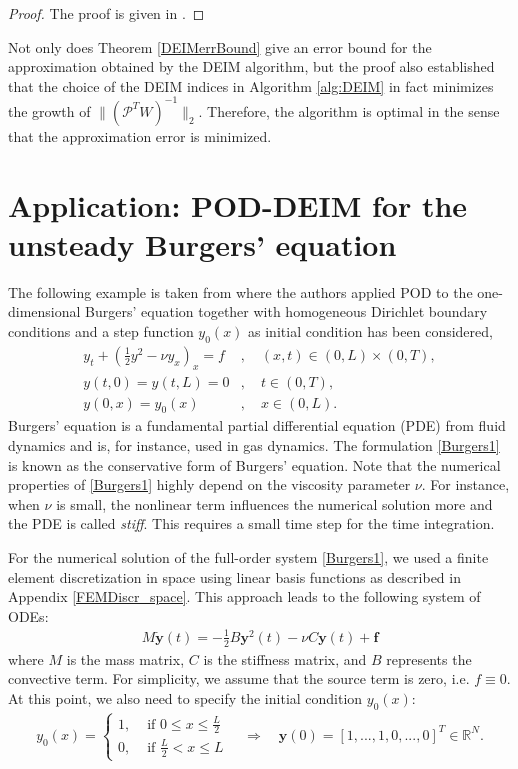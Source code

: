\begin{proof}
The proof is given in \cite[p. 2747-2749]{DEIM}.
\end{proof}
Not only does Theorem \ref{DEIMerrBound} give an error bound for the approximation obtained by the DEIM algorithm, but the proof also established that the choice of the DEIM indices in Algorithm \ref{alg:DEIM} in fact minimizes the growth of $\|(\mathcal{P}^T W)^{-1}\|_2$. Therefore, the algorithm is optimal in the sense that the approximation error is minimized.
\section{Application: POD-DEIM for the unsteady Burgers' equation}
\label{BurgersPODDEIM}
The following example is taken from \cite{KV99} where the authors applied POD to the one-dimensional Burgers' equation together with homogeneous Dirichlet boundary conditions and a step function $y_0(x)$ as initial condition has been considered,
\begin{equation}
\label{Burgers1}
\begin{split}
y_t + \left( \frac{1}{2}y^2 - \nu y_x\right)_x = f &, \quad (x,t) \in (0,L) \times (0,T), \\
y(t,0) = y(t,L) = 0&, \quad t \in (0,T), \\
y(0,x) = y_0(x)&, \quad x \in (0,L).
\end{split}
\end{equation}
Burgers' equation is a fundamental partial differential equation (PDE) from fluid dynamics and is, for instance, used in gas dynamics. The formulation \eqref{Burgers1} is known as the conservative form of Burgers' equation. Note that the numerical properties of \eqref{Burgers1} highly depend on the viscosity parameter $\nu$. For instance, when $\nu$ is small, the nonlinear term influences the numerical solution more and the PDE is called \textit{stiff}. This requires a small time step for the time integration.

For the numerical solution of the full-order system \eqref{Burgers1}, we used a finite element discretization in space using linear basis functions as described in  Appendix \ref{FEMDiscr_space}. This approach leads to the following system of ODEs:
\begin{align}
\label{FEMdiscr}
M \mathbf{\dot y}(t) = -\frac{1}{2} B \mathbf{y}^2(t) - \nu C \mathbf{y}(t) + \mathbf{f}
\end{align}
where $M$ is the mass matrix, $C$ is the stiffness matrix, and $B$ represents the convective term. For simplicity, we assume that the source term is zero, i.e. $f \equiv 0$. At this point, we also need to specify the initial condition $y_0(x)$:
\begin{align}
 \label{FEMdiscr_init}
 y_0(x) = \begin{cases} 1, & \text{ if } 0 \leq x \leq \frac{L}{2} \\ 0, & \text{ if } \frac{L}{2} < x \leq L \end{cases} \quad \Rightarrow \quad \mathbf{y}(0) = [1,...,1,0,...,0]^T \in \mathbb{R}^N.
\end{align}

